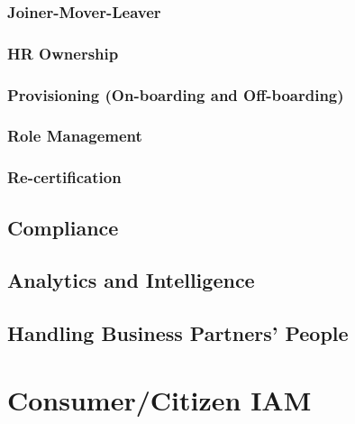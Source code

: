 \hypertarget{joiner-mover-leaver}{%
\subsection{Joiner-Mover-Leaver}\label{joiner-mover-leaver}}

\hypertarget{hr-ownership}{%
\subsection{HR Ownership}\label{hr-ownership}}

\hypertarget{provisioning-on-boarding-and-off-boarding}{%
\subsection{Provisioning (On-boarding and
Off-boarding)}\label{provisioning-on-boarding-and-off-boarding}}

\hypertarget{role-management}{%
\subsection{Role Management}\label{role-management}}

\hypertarget{re-certification}{%
\subsection{Re-certification}\label{re-certification}}

\hypertarget{compliance}{%
\section{Compliance}\label{compliance}}

\hypertarget{analytics-and-intelligence}{%
\section{Analytics and
Intelligence}\label{analytics-and-intelligence}}

\hypertarget{handling-business-partners-people}{%
\section{Handling Business Partners'
People}\label{handling-business-partners-people}}

\hypertarget{consumercitizen-iam}{%
\chapter{Consumer/Citizen IAM}\label{consumercitizen-iam}}

